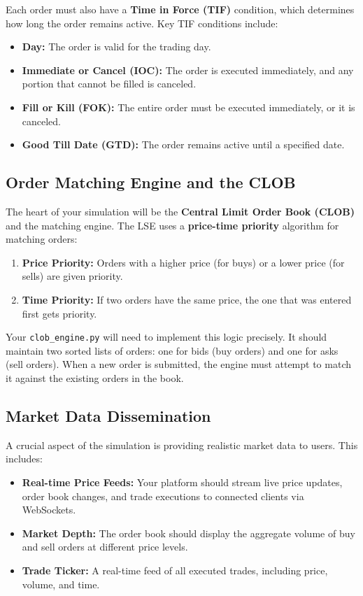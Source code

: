 \documentclass[12pt]{article}
\begin{document}
Each order must also have a \textbf{Time in Force (TIF)} condition, which determines how long the order remains active. Key TIF conditions include:

\begin{itemize}
    \item \textbf{Day:} The order is valid for the trading day.
    \item \textbf{Immediate or Cancel (IOC):} The order is executed immediately, and any portion that cannot be filled is canceled.
    \item \textbf{Fill or Kill (FOK):} The entire order must be executed immediately, or it is canceled.
    \item \textbf{Good Till Date (GTD):} The order remains active until a specified date.
\end{itemize}

\subsection{Order Matching Engine and the CLOB}

The heart of your simulation will be the \textbf{Central Limit Order Book (CLOB)} and the matching engine. The LSE uses a \textbf{price-time priority} algorithm for matching orders:

\begin{enumerate}
    \item \textbf{Price Priority:} Orders with a higher price (for buys) or a lower price (for sells) are given priority.
    \item \textbf{Time Priority:} If two orders have the same price, the one that was entered first gets priority.
\end{enumerate}

Your \texttt{clob\_engine.py} will need to implement this logic precisely. It should maintain two sorted lists of orders: one for bids (buy orders) and one for asks (sell orders). When a new order is submitted, the engine must attempt to match it against the existing orders in the book.

\subsection{Market Data Dissemination}

A crucial aspect of the simulation is providing realistic market data to users. This includes:

\begin{itemize}
    \item \textbf{Real-time Price Feeds:} Your platform should stream live price updates, order book changes, and trade executions to connected clients via WebSockets.
    \item \textbf{Market Depth:} The order book should display the aggregate volume of buy and sell orders at different price levels.
    \item \textbf{Trade Ticker:} A real-time feed of all executed trades, including price, volume, and time.
\end{itemize}
\end{document}
